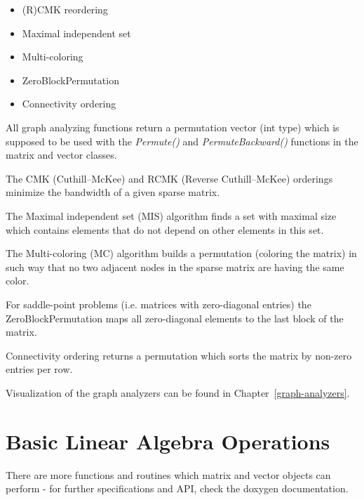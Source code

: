 \begin{itemize}
\itemsep0em
\item (R)CMK reordering
\item Maximal independent set
\item Multi-coloring
\item ZeroBlockPermutation
\item Connectivity ordering
\end{itemize}

All graph analyzing functions return a permutation vector (int type) which is supposed to be used with the \emph{Permute()} and \emph{PermuteBackward()} functions in the matrix and vector classes.

The CMK (Cuthill--McKee) and RCMK (Reverse Cuthill--McKee) orderings minimize the bandwidth of a given sparse matrix.


The Maximal independent set (MIS) algorithm finds a set with maximal size which contains elements that do not depend on other elements in this set.


The Multi-coloring (MC) algorithm builds a permutation (coloring the matrix) in such way that no two adjacent nodes in the sparse matrix are having the same color.


For saddle-point problems (i.e. matrices with zero-diagonal entries) the ZeroBlockPermutation maps all zero-diagonal elements to the last block of the matrix.


Connectivity ordering returns a permutation which sorts the matrix by non-zero entries per row.


Visualization of the graph analyzers can be found in Chapter~\ref{graph-analyzers}.

\section{Basic Linear Algebra Operations}

There are more functions and routines which matrix and vector objects can perform - for further specifications and API, check the doxygen documentation.

